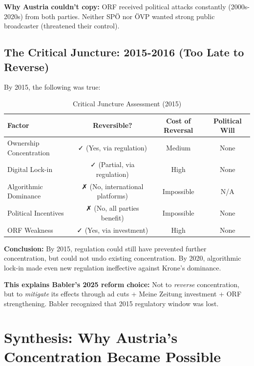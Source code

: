 {\textbf{Why Austria couldn't copy:} ORF received political attacks constantly (2000s-2020s)
from both parties. Neither SPÖ nor ÖVP wanted strong public broadcaster (threatened their control).

\subsection*{The Critical Juncture: 2015-2016 (Too Late to Reverse)}

By 2015, the following was true:

\begin{table}[h]
\centering
\caption{Critical Juncture Assessment (2015)}
\label{tab:bg-critical-juncture}
\begin{tabular}{|l|c|c|c|}
\hline
\textbf{Factor} & \textbf{Reversible?} & \textbf{Cost of Reversal} & \textbf{Political Will} \\
\hline
Ownership Concentration & ✓ (Yes, via regulation) & Medium & None \\
Digital Lock-in & ✓ (Partial, via regulation) & High & None \\
Algorithmic Dominance & ✗ (No, international platforms) & Impossible & N/A \\
Political Incentives & ✗ (No, all parties benefit) & Impossible & None \\
ORF Weakness & ✓ (Yes, via investment) & High & None \\
\hline
\end{tabular}
\end{table}

\textbf{Conclusion:} By 2015, regulation could still have prevented further concentration, but could
not undo existing concentration. By 2020, algorithmic lock-in made even new regulation ineffective
against Krone's dominance.

\textbf{This explains Babler's 2025 reform choice:} Not to \textit{reverse} concentration, but to
\textit{mitigate} its effects through ad cuts + Meine Zeitung investment + ORF strengthening.
Babler recognized that 2015 regulatory window was lost.


\section*{Synthesis: Why Austria's Concentration Became Possible}

}
